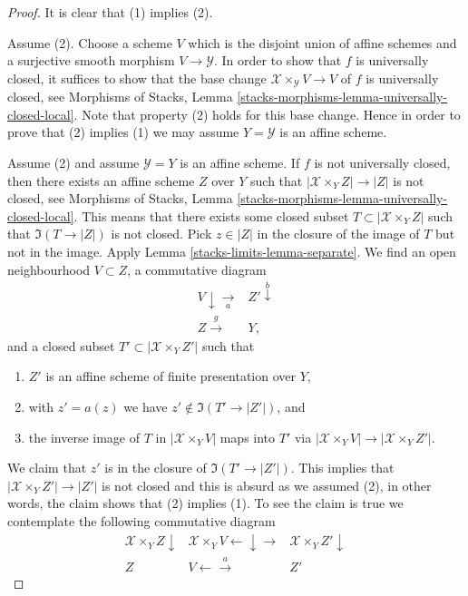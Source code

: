 \begin{proof}
It is clear that (1) implies (2).

\medskip\noindent
Assume (2). Choose a scheme $V$ which is the disjoint union of
affine schemes and a surjective smooth morphism $V \to \mathcal{Y}$.
In order to show that $f$ is universally closed, it suffices to show
that the base change $\mathcal{X} \times_\mathcal{Y} V \to V$ of $f$
is universally closed, see Morphisms of Stacks, Lemma
\ref{stacks-morphisms-lemma-universally-closed-local}.
Note that property (2) holds for this base change.
Hence in order to prove  that (2) implies (1) we may assume
$Y = \mathcal{Y}$ is an affine scheme.

\medskip\noindent
Assume (2) and assume $\mathcal{Y} = Y$ is an affine scheme.
If $f$ is not universally closed, then there exists an affine
scheme $Z$ over $Y$ such that $|\mathcal{X} \times_Y Z| \to |Z|$
is not closed, see Morphisms of Stacks, Lemma
\ref{stacks-morphisms-lemma-universally-closed-local}.
This means that there exists some closed subset
$T \subset |\mathcal{X} \times_Y Z|$
such that $\Im(T \to |Z|)$ is not closed. Pick $z \in |Z|$
in the closure of the image of $T$ but not in the image.
Apply Lemma \ref{stacks-limits-lemma-separate}.
We find an open neighbourhood $V \subset Z$, a commutative diagram
$$
\begin{array}{cc}V \downarrow\underset{a}{\longrightarrow} & Z' \overset{b}{\downarrow} \\ Z \overset{g}{\longrightarrow} & Y,\end{array}
$$
and a closed subset $T' \subset |\mathcal{X} \times_Y Z'|$ such that
\begin{enumerate}
\item $Z'$ is an affine scheme of finite presentation over $Y$,
\item with $z' = a(z)$ we have $z' \not \in \Im(T' \to |Z'|)$, and
\item the inverse image of $T$ in $|\mathcal{X} \times_Y V|$ maps into $T'$ via
$|\mathcal{X} \times_Y V| \to |\mathcal{X} \times_Y Z'|$.
\end{enumerate}
We claim that $z'$ is in the closure of $\Im(T' \to |Z'|)$.
This implies that $|\mathcal{X} \times_Y Z'| \to |Z'|$ is not closed
and this is absurd as we assumed (2), in other words,
the claim shows that (2) implies (1).
To see the claim is true we contemplate the
following commutative diagram
$$
\begin{array}{ccc}\mathcal{X} \times_Y Z \downarrow & \mathcal{X} \times_Y V \longleftarrow\downarrow\longrightarrow & \mathcal{X} \times_Y Z' \downarrow \\ Z & V \longleftarrow\overset{a}{\longrightarrow} & Z'\end{array}
$$
\end{proof}
